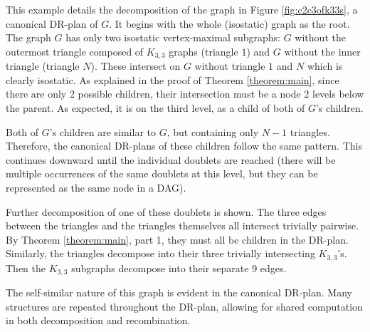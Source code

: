 \begin{example}
    This example details the decomposition of the graph in Figure \ref{fig:c2c3ofk33s}, a canonical DR-plan of $G$. It begins with the whole (isostatic) graph as the root. The graph $G$ has only two isostatic vertex-maximal subgraphs: $G$ without the outermost triangle composed of $K_{3,3}$ graphs (triangle $1$) and $G$ without the inner triangle (triangle $N$). These intersect on $G$ without triangle $1$ and $N$ which is clearly isostatic. As explained in the proof of Theorem \ref{theorem:main}, since there are only 2 possible children, their intersection must be a node 2 levels below the parent. As expected, it is on the third level, as a child of both of $G$'s children.

    Both of $G$'s children are similar to $G$, but containing only $N-1$ triangles. Therefore, the canonical DR-plans of these children follow the same pattern. This continues downward until the individual doublets are reached (there will be multiple occurrences of the same doublets at this level, but they can be represented as the same node in a DAG).

    Further decomposition of one of these doublets is shown. The three edges between the triangles and the triangles themselves all intersect trivially pairwise. By Theorem \ref{theorem:main}, part 1, they must all be children in the DR-plan. Similarly, the triangles decompose into their three trivially intersecting $K_{3,3}$'s. Then the $K_{3,3}$ subgraphs decompose into their separate 9 edges.

    The self-similar nature of this graph is evident in the canonical DR-plan. Many structures are repeated throughout the DR-plan, allowing for shared computation in both decomposition and recombination.
\end{example}





